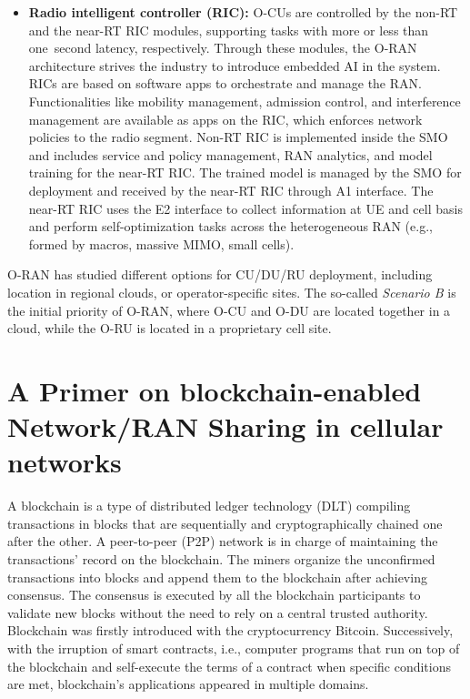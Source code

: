 \documentclass[journal]{IEEEtran}
\begin{document}
\begin{itemize}
		\item \textbf{Radio intelligent controller (RIC):} O-CUs are controlled by the non-RT and the near-RT RIC modules, supporting tasks with more or less than one~second latency, respectively. Through these modules, the {O-RAN} architecture strives the industry to introduce embedded AI in the system. RICs are based on software apps to orchestrate and manage the RAN. Functionalities like mobility management, admission control, and interference management are available as apps on the RIC, which enforces network policies to the radio segment. Non-RT RIC is implemented inside the SMO and includes service and policy management, RAN analytics, and model training for the near-RT RIC. The trained model is managed by the SMO for deployment and received by the near-RT RIC through A1 interface. The near-RT RIC uses the E2 interface to collect information at UE and cell basis and perform self-optimization tasks across the heterogeneous RAN (e.g., formed by macros, massive MIMO, small cells).
	\end{itemize}
	O-RAN has studied different options for CU/DU/RU deployment, including location in regional clouds, or operator-specific sites. The so-called \textit{Scenario B} is the initial priority of {O-RAN}, where O-CU and O-DU are located together in a cloud, while the O-RU is located in a proprietary cell site.
	
	\section{A Primer on blockchain-enabled Network/RAN Sharing in cellular networks}
	\label{section:related_work}
	
	A blockchain is a type of distributed ledger technology (DLT) compiling transactions in blocks that are sequentially and cryptographically chained one after the other. A peer-to-peer (P2P) network is in charge of maintaining the transactions' record on the blockchain. The miners organize the unconfirmed transactions into blocks and append them to the blockchain after achieving consensus. The consensus is executed by all the blockchain participants to validate new blocks without the need to rely on a central trusted authority. Blockchain was firstly introduced with the cryptocurrency Bitcoin. Successively, with the irruption of smart contracts, i.e., computer programs that run on top of the blockchain and self-execute the terms of a contract when specific conditions are met, blockchain's applications appeared in multiple domains.%
	
\end{document}
